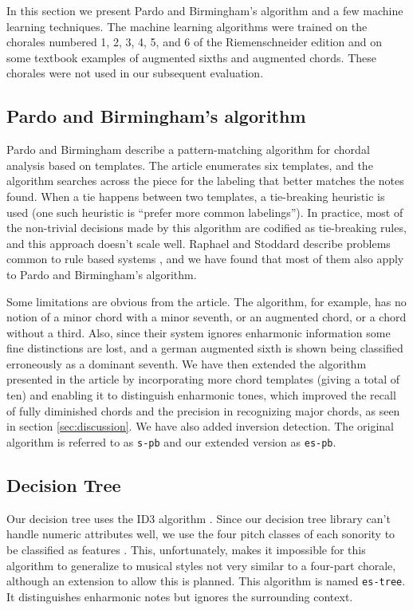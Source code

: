 \documentclass{article}
\begin{document}
In this section we present Pardo and Birmingham's algorithm and a few
machine learning techniques. The machine learning algorithms were
trained on the chorales numbered 1, 2, 3, 4, 5, and 6 of the
Riemenschneider edition and on some textbook examples of augmented
sixths and augmented chords. These chorales were not used in our
subsequent evaluation.

\subsection{Pardo and Birmingham's algorithm}
\label{sec:pardo}


Pardo and Birmingham \cite{pardo.ea:algorithms} describe a
pattern-matching algorithm for chordal analysis based on templates.
The article enumerates six templates, and the algorithm searches
across the piece for the labeling that better matches the notes found.
When a tie happens between two templates, a tie-breaking heuristic is
used (one such heuristic is ``prefer more common labelings''). In
practice, most of the non-trivial decisions made by this algorithm are
codified as tie-breaking rules, and this approach doesn't scale
well. Raphael and Stoddard describe problems common to rule based
systems \cite{raphael.ea:harmonic}, and we have found that most of
them also apply to Pardo and Birmingham's algorithm.

Some limitations are obvious from the article. The algorithm, for
example, has no notion of a minor chord with a minor seventh, or an
augmented chord, or a chord without a third. Also, since their system
ignores enharmonic information some fine distinctions are lost, and a
german augmented sixth is shown being classified erroneously as a
dominant seventh. We have then extended the algorithm presented in the
article by incorporating more chord templates (giving a total of ten)
and enabling it to distinguish enharmonic tones, which improved the
recall of fully diminished chords and the precision in recognizing
major chords, as seen in section \ref{sec:discussion}. We have also
added inversion detection. The original algorithm is referred to as
\texttt{s-pb} and our extended version as \texttt{es-pb}.

\subsection{Decision Tree}
\label{sec:tree}

Our decision tree uses the ID3 algorithm \cite{mitchell:machine}.
Since our decision tree library can't handle numeric attributes well,
we use the four pitch classes of each sonority to be classified as
features . This, unfortunately, makes it impossible for this algorithm
to generalize to musical styles not very similar to a four-part
chorale, although an extension to allow this is planned. This
algorithm is named \texttt{es-tree}. It distinguishes enharmonic notes
but ignores the surrounding context.
\end{document}
